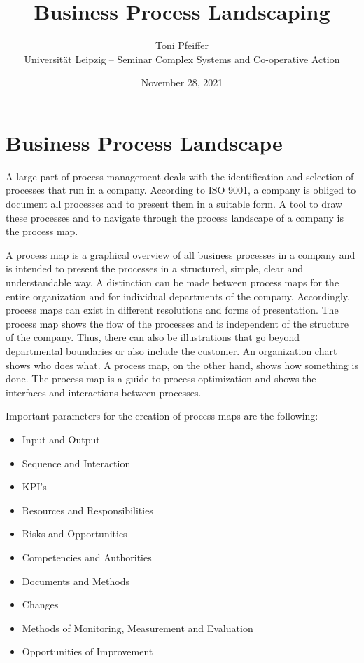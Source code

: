 \documentclass[11pt,a4paper]{article}
\title{Business Process Landscaping}
\author{Toni Pfeiffer\\[.3cm] Universität Leipzig -- Seminar Complex Systems
  and Co-operative Action }
\date{November 28, 2021}
\begin{document}
\maketitle

\section{Business Process Landscape}

A large part of process management deals with the identification and selection
of processes that run in a company. According to ISO 9001, a company is
obliged to document all processes and to present them in a suitable form. A
tool to draw these processes and to navigate through the process landscape of
a company is the process map.

A process map is a graphical overview of all business processes in a company
and is intended to present the processes in a structured, simple, clear and
understandable way. A distinction can be made between process maps for the
entire organization and for individual departments of the company.
Accordingly, process maps can exist in different resolutions and forms of
presentation. The process map shows the flow of the processes and is
independent of the structure of the company. Thus, there can also be
illustrations that go beyond departmental boundaries or also include the
customer. An organization chart shows who does what. A process map, on the
other hand, shows how something is done. The process map is a guide to process
optimization and shows the interfaces and interactions between processes.

Important parameters for the creation of process maps are the following:

\begin{itemize}
\item Input and Output
\item Sequence and Interaction
\item KPI's
\item Resources and Responsibilities
\item Risks and Opportunities
\item Competencies and Authorities
\item Documents and Methods
\item Changes
\item Methods of Monitoring, Measurement and Evaluation
\item Opportunities of Improvement
\end{itemize}
\end{document}
